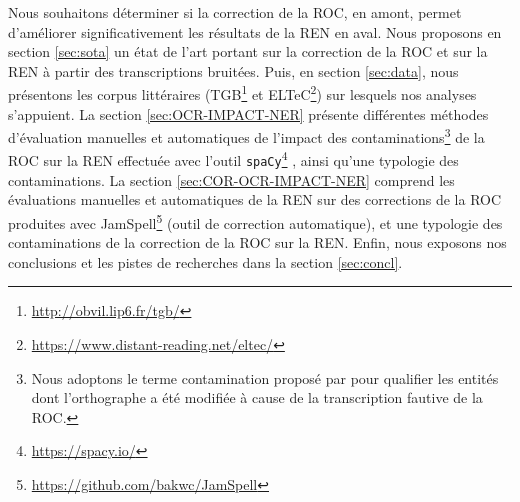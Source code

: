 Nous souhaitons déterminer si la correction de la ROC, en amont, permet d’améliorer  significativement les résultats de la REN en aval. Nous proposons en section \ref{sec:sota} un état de l'art portant sur la correction de la ROC et sur la REN à partir des transcriptions bruitées. Puis, en section \ref{sec:data}, nous présentons les corpus littéraires (TGB\footnote{\url{http://obvil.lip6.fr/tgb/}} et ELTeC\footnote{\url{https://www.distant-reading.net/eltec/}}) sur lesquels nos analyses s'appuient. La section \ref{sec:OCR-IMPACT-NER} présente différentes méthodes d'évaluation manuelles et automatiques de l'impact des contaminations\footnote{Nous adoptons le terme \og{}contamination\fg{} proposé par  pour qualifier les entités dont l'orthographe a été modifiée à cause de la transcription fautive de la ROC.} de la ROC sur la REN effectuée avec l'outil \texttt{spaCy}\footnote{\url{https://spacy.io/}} \cite{ines_montani_2023_7715077}, ainsi qu'une typologie des contaminations. La section \ref{sec:COR-OCR-IMPACT-NER} comprend les évaluations manuelles et automatiques de la REN sur des corrections de la ROC produites avec JamSpell\footnote{\url{https://github.com/bakwc/JamSpell}} (outil de correction automatique), et une typologie des contaminations de la correction de la ROC sur la REN. 
Enfin, nous exposons nos conclusions et les pistes de recherches dans la section \ref{sec:concl}.
